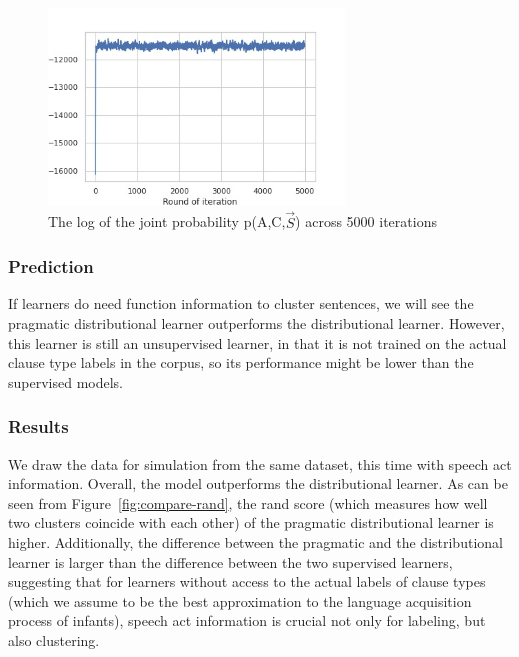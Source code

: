 \begin{figure}[H]
    \centering
    \includegraphics[width=0.7\textwidth]{figures/target-iters.jpg}
    \caption{The log of the joint probability p(A,C,$\vec{S}$) across 5000 iterations}
    \label{fig:target-iters}
\end{figure}




\subsubsection{Prediction}
\label{sec:engcl:model:prag:predict}


If learners do need function information to cluster sentences, we will see the pragmatic distributional learner outperforms the distributional learner. However, this learner is still an unsupervised learner, in that it is not trained on the actual clause type labels in the corpus, so its performance might be lower than the supervised models.



\subsubsection{Results}
\label{sec:engcl:model:prag:results}

We draw the data for simulation from the same dataset, this time with speech act information. Overall, the model outperforms the distributional learner. As can be seen from Figure~\ref{fig:compare-rand}, the rand score (which measures how well two clusters coincide with each other) of the pragmatic distributional learner is higher. Additionally, the difference between the pragmatic and the distributional learner is larger than the difference between the two supervised learners, suggesting that for learners without access to the actual labels of clause types (which we assume to be the best approximation to the language acquisition process of infants), speech act information is crucial not only for labeling, but also clustering. 



